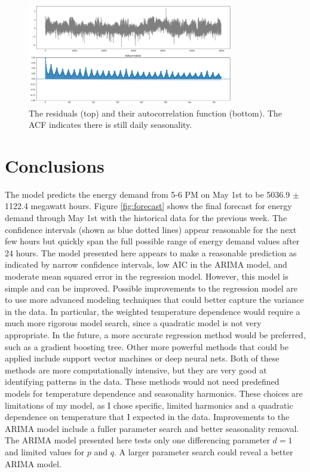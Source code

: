 \documentclass[12pt]{article}
\begin{document}
\begin{figure}[h]
    \centering
    \includegraphics[width=0.8\textwidth]{figures/residuals.png}
    \caption{The residuals (top) and their autocorrelation function (bottom). The ACF indicates there is still daily seasonality.}
    \label{fig:residuals}
\end{figure}


\section*{Conclusions}

The model predicts the energy demand from 5-6 PM on May 1st to be 5036.9 $\pm$ 1122.4 megawatt hours. Figure \ref{fig:forecast} shows the final forecast for energy demand through May 1st with the historical data for the previous week. The confidence intervals (shown as blue dotted lines) appear reasonable for the next few hours but quickly span the full possible range of energy demand values after 24 hours. The model presented here appears to make a reasonable prediction as indicated by narrow confidence intervals, low AIC in the ARIMA model, and moderate mean squared error in the regression model. However, this model is simple and can be improved. Possible improvements to the regression model are to use more advanced modeling techniques that could better capture the variance in the data. In particular, the weighted temperature dependence would require a much more rigorous model search, since a quadratic model is not very appropriate. In the future, a more accurate regression method would be preferred, such as a gradient boosting tree. Other more powerful methods that could be applied include support vector machines or deep neural nets. Both of these methods are more computationally intensive, but they are very good at identifying patterns in the data. These methods would not need predefined models for temperature dependence and seasonality harmonics. These choices are limitations of my model, as I chose specific, limited harmonics and a quadratic dependence on temperature that I expected in the data. Improvements to the ARIMA model include a fuller parameter search and better seasonality removal. The ARIMA model presented here tests only one differencing parameter $d=1$ and limited values for $p$ and $q$. A larger parameter search could reveal a better ARIMA model.
\end{document}
